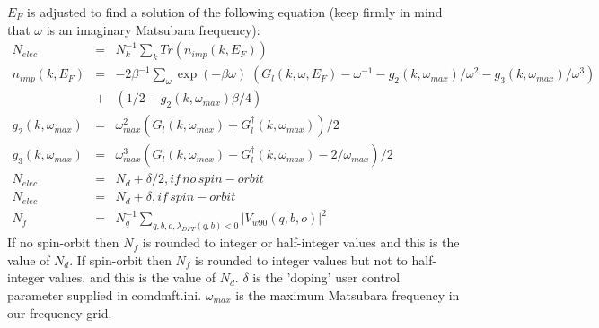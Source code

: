 \documentclass[aps,prb,singlecolumn,preprintnumbers,amsmath,amssymb]{revtex4}
\begin{document}
$E_F$ is adjusted to find a solution of the following equation (keep firmly in mind that $\omega$ is an imaginary Matsubara frequency): 
\begin{eqnarray}
N_{elec} &=&  N_k^{-1} \sum_k  Tr(n_{imp}(k, E_F)) \nonumber \\
n_{imp}(k,E_F) &=& -2 \beta^{-1}\sum_{\omega} \exp(-\beta \omega) \;  (G_{l}(k,\omega,E_F) - \omega^{-1} - g_2(k,\omega_{max}) / \omega^2 - g_3(k,\omega_{max}) / \omega^3) \nonumber \\
&+&  (1/2 - g_2(k,\omega_{max}) \beta/4) \nonumber \\
g_2(k,\omega_{max}) &=& \omega_{max}^2  (G_{l}(k,\omega_{max}) + G_{l}^\dagger(k,\omega_{max}))/2 \nonumber \\
g_3(k,\omega_{max}) &=& \omega_{max}^3  (G_{l}(k,\omega_{max}) - G_{l}^\dagger(k,\omega_{max})  - 2/\omega_{max})/2  \nonumber \\
N_{elec} &=& N_d + \delta/2, if\,no\,spin-orbit \nonumber \\
N_{elec} &=& N_d + \delta, if\,spin-orbit \nonumber \\
N_f &=& N_q^{-1} \sum_{q,b,o, \lambda_{DFT}(q,b) < 0} |V_{w90}(q,b,o)|^2 \nonumber
\end{eqnarray}
If no spin-orbit then $N_f$ is rounded to integer or half-integer values and this is the value of $N_d$. If spin-orbit then $N_f$ is rounded to integer values but not to half-integer values, and this is the value of $N_d$. $\delta$ is the 'doping' user control parameter supplied in comdmft.ini.  $\omega_{max}$ is the maximum Matsubara frequency in our frequency grid.
\end{document}
